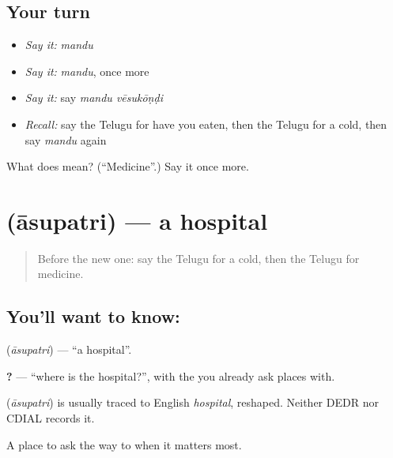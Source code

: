 \subsection*{Your turn}
\begin{itemize}
\raggedright
  \item \emph{Say it:} \emph{mandu}
  \item \emph{Say it:} \emph{mandu}, once more
  \item \emph{Say it:} say \emph{mandu vēsukōṇḍi}
  \item \emph{Recall:} say the Telugu for have you eaten, then the Telugu for a cold, then say \emph{mandu} again
\end{itemize}

\begin{tcolorbox}[breakable,colback=teal!4,colframe=teal!35!black,title={Before you move on}]
What does  mean? (\textquotedblleft{}Medicine\textquotedblright{}.) Say it once more.
\end{tcolorbox}
\section[\texorpdfstring{\te{ఆసుపత్రి} (āsupatri)}{ఆసుపత్రి (āsupatri)}]{ (āsupatri) — a hospital}

\label{lesson:TE-C92-hospital}



\begin{quote}
Before the new one: say the Telugu for a cold, then the Telugu for medicine.
\end{quote}

\subsection*{You'll want to know: }
\textbf{} (\emph{āsupatri}) — \textquotedblleft{}a hospital\textquotedblright{}.

\textbf{ ?} — \textquotedblleft{}where is the hospital?\textquotedblright{}, with the \textbf{} you already ask places with.

\begin{cousinweb}
\textbf{} (\emph{āsupatri}) is usually traced to English \emph{hospital}, reshaped. Neither DEDR nor CDIAL records it.
\end{cousinweb}

\begin{grammarlens}[title={What you've built}]
A place to ask the way to when it matters most.
\end{grammarlens}

